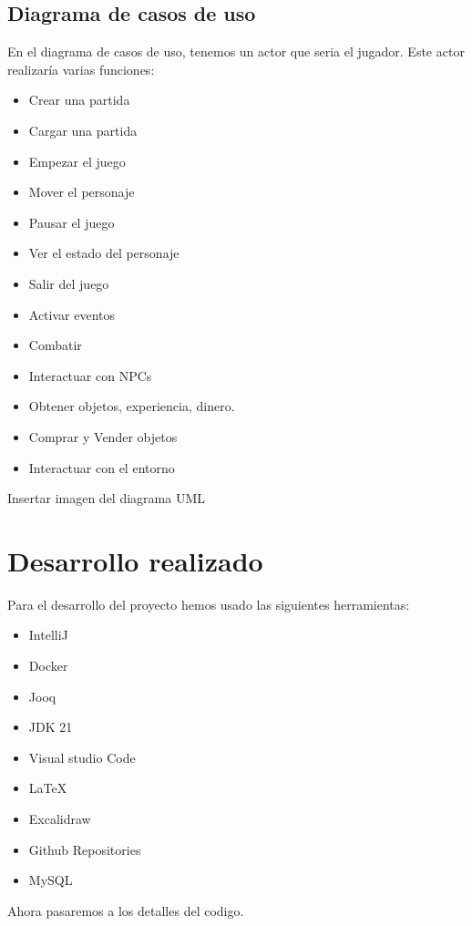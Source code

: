 \documentclass[a4paper]{article}
\begin{document}
\clearpage
\subsection{Diagrama de casos de uso}
En el diagrama de casos de uso, tenemos un actor que seria el jugador. Este actor realizaría varias funciones:
\begin{itemize}
    \item Crear una partida
    \item Cargar una partida
    \item Empezar el juego
    \item Mover el personaje
    \item Pausar el juego
    \item Ver el estado del personaje
    \item Salir del juego
    \item Activar eventos
    \item Combatir
    \item Interactuar con NPCs
    \item Obtener objetos, experiencia, dinero.
    \item Comprar y Vender objetos
    \item Interactuar con el entorno
\end{itemize}

Insertar imagen del diagrama UML

\clearpage



\section{Desarrollo realizado}
Para el desarrollo del proyecto hemos usado las siguientes herramientas:
\begin{itemize}
    \item IntelliJ
    \item Docker
    \item Jooq
    \item JDK 21
    \item Visual studio Code
    \item \LaTeX
    \item Excalidraw
    \item Github Repositories
    \item MySQL
\end{itemize}
Ahora pasaremos a los detalles del codigo.
\end{document}

